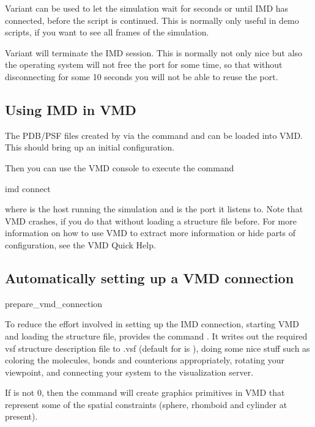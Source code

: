 Variant  can be used to let the simulation wait for
 seconds or until IMD has connected, before the script is
continued. This is normally only useful in demo scripts, if you want
to see all frames of the simulation.

Variant  will terminate the IMD session. This is normally
not only nice but also the operating system will not free the port for
some time, so that without disconnecting for some 10 seconds you will
not be able to reuse the port.

\subsection{Using IMD in VMD}

The PDB/PSF files created by \es via the command  and
 can be loaded into VMD. This should bring up an initial
configuration.

Then you can use the VMD console to execute the command
\begin{code}
  imd connect  
\end{code}
where  is the host running the simulation and  is
the port it listens to. Note that VMD crashes, if you do that without
loading a structure file before.  For more information on how to use
VMD to extract more information or hide parts of configuration, see
the VMD Quick Help.

\subsection{Automatically setting up a VMD connection}

\begin{essyntax}
prepare_vmd_connection 
\end{essyntax}

To reduce the effort involved in setting up the IMD connection,
starting VMD and loading the structure file, \es provides the command
.  It writes out the required
vsf structure description file to .vsf (default
for  is ), doing some nice stuff such as
coloring the molecules, bonds and counterions appropriately, rotating
your viewpoint, and connecting your system to the visualization
server.

If  is not 0, then the command will create graphics
primitives in VMD that represent some of the spatial constraints
(sphere, rhomboid and cylinder at present).

